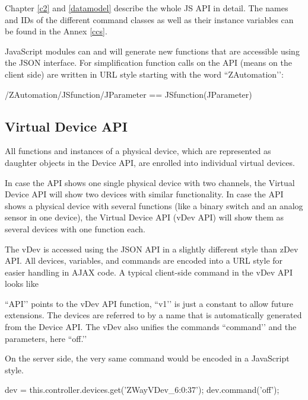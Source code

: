 Chapter \ref{c2} and \ref{datamodel} describe the whole JS API in detail. The 
names and IDs of the different command classes as well as their instance variables 
can be found in the Annex \ref{ccs}.

JavaScript modules can and will generate new functions that are accessible using the 
JSON interface. For simplification function calls on the API (means on the client side) 
are written in URL style starting with the word ``ZAutomation’’:


\begin{center}
/ZAutomation/JSfunction/JParameter
== JSfunction(JParameter)
\end{center}

\subsection{Virtual Device API}

All functions and instances of a physical device, which are represented as daughter objects
in the \zwave Device API, are enrolled into individual virtual devices.

In case the \zwave API shows one single physical device with two channels, the Virtual 
Device API will show two devices with similar functionality. In case the \zwave API shows 
a physical device with several functions (like a binary switch and an analog sensor in 
one device), the Virtual Device API (vDev API) will show them as several devices with 
one function each.

The vDev is accessed using the JSON API in a slightly different style than zDev API. 
All devices, variables, and commands are encoded into a URL style for easier handling 
in AJAX code. A typical client-side command in the vDev API looks like




``API’’ points to the vDev API function, ``v1’’ is just a constant to allow future extensions. 
The devices are referred to by a name that is automatically generated from the \zwave Device 
API. The vDev also unifies the commands ``command’’ and the parameters, here ``off.’’

On the server side, the very same command would be encoded in a JavaScript style.

\begin{listingverbatim}
dev = this.controller.devices.get('ZWayVDev\_6:0:37');
dev.command('off');
\end{listingverbatim}

